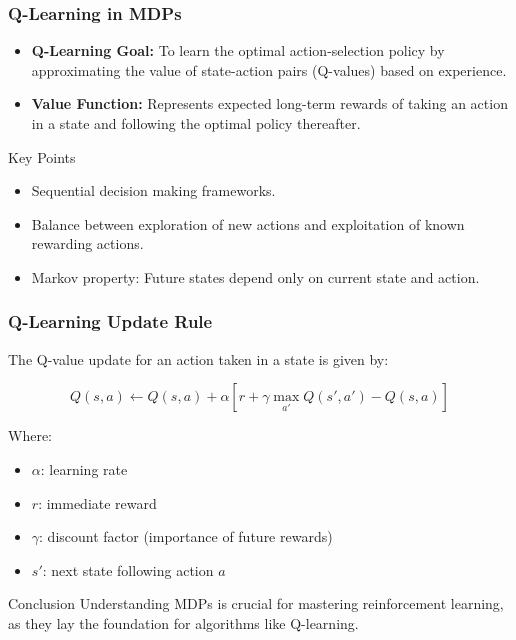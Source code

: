 \documentclass{beamer}
\begin{document}
\begin{frame}[fragile]
    \frametitle{Q-Learning in MDPs}
    \begin{itemize}
        \item \textbf{Q-Learning Goal:}
        To learn the optimal action-selection policy by approximating the value of state-action pairs (Q-values) based on experience.
        
        \item \textbf{Value Function:}
        Represents expected long-term rewards of taking an action in a state and following the optimal policy thereafter.
    \end{itemize}

    \begin{block}{Key Points}
        \begin{itemize}
            \item Sequential decision making frameworks.
            \item Balance between exploration of new actions and exploitation of known rewarding actions.
            \item Markov property: Future states depend only on current state and action.
        \end{itemize}
    \end{block}
\end{frame}

\begin{frame}[fragile]
    \frametitle{Q-Learning Update Rule}
    The Q-value update for an action taken in a state is given by:
    
    \begin{equation}
    Q(s, a) \leftarrow Q(s, a) + \alpha \left[ r + \gamma \max_{a'} Q(s', a') - Q(s, a) \right]
    \end{equation}

    Where:
    \begin{itemize}
        \item $ \alpha $: learning rate
        \item $ r $: immediate reward
        \item $ \gamma $: discount factor (importance of future rewards)
        \item $ s' $: next state following action $ a $
    \end{itemize}
    
    \begin{block}{Conclusion}
        Understanding MDPs is crucial for mastering reinforcement learning, as they lay the foundation for algorithms like Q-learning.
    \end{block}
\end{frame}
\end{document}
